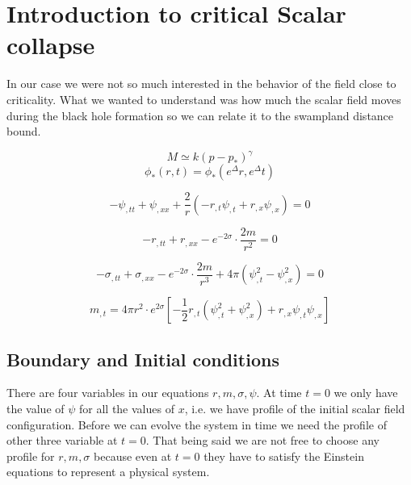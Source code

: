 \chapter{Introduction to critical Scalar collapse}

In our case we were not so much interested in the behavior of the field close to criticality. What we wanted to understand was how much the scalar field moves during the black hole formation so we can relate it to the swampland distance bound.

\begin{equation}M \simeq k\left(p-p_{*}\right)^{\gamma}\end{equation}
\begin{equation}\phi_{*}(r, t)=\phi_{*}\left(e^{\Delta} r, e^{\Delta} t\right)\end{equation}


\begin{equation}
    -\psi_{, t t}+\psi_{, x x}+\frac{2}{r}\left(-r_{, t} \psi_{, t}+r_{, x} \psi_{, x}\right)=0
\end{equation}

\begin{equation}
    -r_{, t t}+r_{, x x}-e^{-2 \sigma} \cdot \frac{2 m}{r^{2}}=0
\end{equation}

\begin{equation}
    -\sigma_{, t t}+\sigma_{, x x}-e^{-2 \sigma} \cdot \frac{2 m}{r^{3}}+4 \pi\left(\psi_{, t}^{2}-\psi_{, x}^{2}\right)=0
\end{equation}

\begin{equation}m_{, t}=4 \pi r^{2} \cdot e^{2 \sigma}\left[-\frac{1}{2} r_{, t}\left(\psi_{, t}^{2}+\psi_{, x}^{2}\right)+r_{, x} \psi_{, t} \psi_{, x}\right]\end{equation}


\section{Boundary and Initial conditions} \label{sec:boundary_and_initial_conditions}

There are four variables in our equations $r,m,\sigma,\psi$. At time $t=0$ we only have the value of $\psi$ for all the values of $x$, i.e. we have profile of the initial scalar field configuration. Before we can evolve the system in time we need the profile of other three variable at $t=0$. That being said we are not free to choose any profile for $r,m,\sigma$ because even at $t=0$ they have to satisfy the Einstein equations to represent a physical system.


